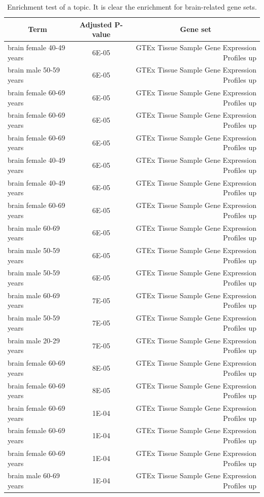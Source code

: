 \begin{table}[htb!]
	\tiny
	\begin{center}
		\begin{tabular}{|l|c|r|}
			\hline
			\multicolumn{1}{|c}{Term} & \multicolumn{1}{|c|}{Adjusted P-value} & \multicolumn{1}{c|}{Gene set} \\ \hline
			brain female 40-49 years & 6E-05 & GTEx Tissue Sample Gene Expression Profiles up \\ \hline
			brain male 50-59 years & 6E-05 & GTEx Tissue Sample Gene Expression Profiles up \\ \hline
			brain female 60-69 years & 6E-05 & GTEx Tissue Sample Gene Expression Profiles up \\ \hline
			brain female 60-69 years & 6E-05 & GTEx Tissue Sample Gene Expression Profiles up \\ \hline
			brain female 60-69 years & 6E-05 & GTEx Tissue Sample Gene Expression Profiles up \\ \hline
			brain female 40-49 years & 6E-05 & GTEx Tissue Sample Gene Expression Profiles up \\ \hline
			brain female 40-49 years & 6E-05 & GTEx Tissue Sample Gene Expression Profiles up \\ \hline
			brain female 60-69 years & 6E-05 & GTEx Tissue Sample Gene Expression Profiles up \\ \hline
			brain male 60-69 years & 6E-05 & GTEx Tissue Sample Gene Expression Profiles up \\ \hline
			brain male 50-59 years & 6E-05 & GTEx Tissue Sample Gene Expression Profiles up \\ \hline
			brain male 50-59 years & 6E-05 & GTEx Tissue Sample Gene Expression Profiles up \\ \hline
			brain male 60-69 years & 7E-05 & GTEx Tissue Sample Gene Expression Profiles up \\ \hline
			brain male 50-59 years & 7E-05 & GTEx Tissue Sample Gene Expression Profiles up \\ \hline
			brain male 20-29 years & 7E-05 & GTEx Tissue Sample Gene Expression Profiles up \\ \hline
			brain female 60-69 years & 8E-05 & GTEx Tissue Sample Gene Expression Profiles up \\ \hline
			brain female 60-69 years & 8E-05 & GTEx Tissue Sample Gene Expression Profiles up \\ \hline
			brain female 60-69 years & 1E-04 & GTEx Tissue Sample Gene Expression Profiles up \\ \hline
			brain female 60-69 years & 1E-04 & GTEx Tissue Sample Gene Expression Profiles up \\ \hline
			brain female 60-69 years & 1E-04 & GTEx Tissue Sample Gene Expression Profiles up \\ \hline
			brain male 60-69 years & 1E-04 & GTEx Tissue Sample Gene Expression Profiles up \\ \hline
		\end{tabular}
	\end{center}
	\caption{Enrichment test of a topic. It is clear the enrichment for brain-related gene sets.}
	\label{tab:topic/enrich/brain}
\end{table}
